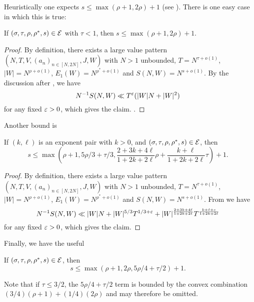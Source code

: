 Heuristically one expects $s \leq \max( \rho+1, 2\rho)+1$ (see \cite[(11.63)]{ivic}).  There is one easy case in which this is true:

\begin{lemma}\label{easy-double-zeta-bound}  If $(\sigma,\tau,\rho,\rho^*,s) \in \mathcal{E}$ with $\tau < 1$, then $s \leq \max(\rho+1, 2\rho)+1$.
\end{lemma}

\literature
{}

\begin{proof} By definition, there exists a large value pattern $(N,T,V,(a_n)_{n \in [N,2N]},J,W)$ with $N>1$ unbounded, $T = N^{\tau+o(1)}$, $|W| = N^{\rho+o(1)}$, $E_1(W) = N^{\rho^*+o(1)}$ and $S(N,W) = N^{s+o(1)}$.  By the discussion after \cite[(11.63)]{ivic}, we have
    $$ N^{-1} S(N,W) \ll T^\varepsilon ( |W| N + |W|^2 )$$
for any fixed $\varepsilon>0$, which gives the claim.    .
\end{proof}

Another bound is

\begin{lemma}\label{double-zeta-from-exp-pair}\cite[Lemma 11.2]{ivic}  If $(k,\ell)$ is an exponent pair with $k>0$, and $(\sigma,\tau,\rho,\rho^*,s) \in \mathcal{E}$, then
$$ s \leq \max\left( \rho+1, 5\rho/3 + \tau/3, \frac{2+3k+4\ell}{1+2k+2\ell} \rho + \frac{k+\ell}{1+2k+2\ell} \tau\right) + 1.$$
\end{lemma}

\begin{proof} By definition, there exists a large value pattern $(N,T,V,(a_n)_{n \in [N,2N]},J,W)$ with $N>1$ unbounded, $T = N^{\tau+o(1)}$, $|W| = N^{\rho+o(1)}$, $E_1(W) = N^{\rho^*+o(1)}$ and $S(N,W) = N^{s+o(1)}$.   From \cite[Lemma 11.2]{ivic} we have
$$ N^{-1} S(N,W) \ll |W| N + |W|^{5/3} T^{1/3+\varepsilon} + |W|^{\frac{2+3k+4\ell}{1+2k+2\ell}} T^{\frac{k+\ell+\varepsilon}{1+2k+2\ell}}$$
for any fixed $\varepsilon>0$, which gives the claim.
\end{proof}

Finally, we have the useful

\begin{lemma}\label{hb-double}  If $(\sigma,\tau,\rho,\rho^*,s) \in \mathcal{E}$, then
    $$ s \leq \max( \rho+1, 2\rho, 5\rho/4+\tau/2) + 1.$$
\end{lemma}

Note that if $\tau \leq 3/2$, the $5\rho/4+\tau/2$ term is bounded by the convex combination $(3/4)(\rho+1)+(1/4)(2\rho)$ and may therefore be omitted.

